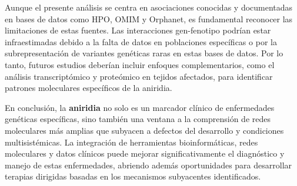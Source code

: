 Aunque el presente análisis se centra en asociaciones conocidas y documentadas en bases de datos como HPO, OMIM y Orphanet, es fundamental reconocer las limitaciones de estas fuentes. Las interacciones gen-fenotipo podrían estar infraestimadas debido a la falta de datos en poblaciones específicas o por la subrepresentación de variantes genéticas raras en estas bases de datos. Por lo tanto, futuros estudios deberían incluir enfoques complementarios, como el análisis transcriptómico y proteómico en tejidos afectados, para identificar patrones moleculares específicos de la aniridia.

En conclusión, la \textbf{aniridia} no solo es un marcador clínico de enfermedades genéticas específicas, sino también una ventana a la comprensión de redes moleculares más amplias que subyacen a defectos del desarrollo y condiciones multisistémicas. La integración de herramientas bioinformáticas, redes moleculares y datos clínicos puede mejorar significativamente el diagnóstico y manejo de estas enfermedades, abriendo además oportunidades para desarrollar terapias dirigidas basadas en los mecanismos subyacentes identificados.
